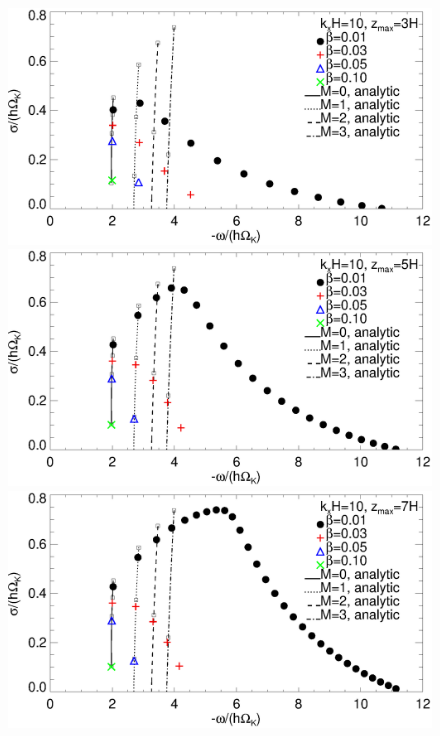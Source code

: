 


\begin{figure}
  \includegraphics[width=\linewidth,clip=true,trim=0cm 1.75cm 0cm
  0cm]{figures/compare_modes_cool_kx10_z3_analytic.ps} 
  \includegraphics[width=\linewidth,clip=true,trim=0cm 1.75cm 0cm
  0cm]{figures/compare_modes_cool_kx10_z5_analytic.ps}
  \includegraphics[width=\linewidth]{figures/compare_modes_cool_kx10_z7_analytic.ps}

\end{figure}
